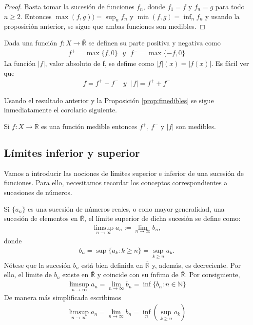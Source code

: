 \begin{proof}
    Basta tomar la sucesión de funciones $f_n$, donde $f_1 = f$ y $f_n = g$ para todo $n \ge 2$. Entonces $\max(f,g) ) = \sup_n{f_n}$ y $\min(f,g) = \inf_n{f_n}$ y usando la proposición anterior, se sigue que ambas funciones son medibles.
\end{proof}

\begin{defi}
    Dada una función $f: X \longrightarrow \overline{\mathbb{R}}$ se definen su parte positiva y negativa como
    \begin{align*}
        f^+ = \max\{ f, 0\} \ \ \ y \ \ \ f^- = \max\{ -f, 0\}
    \end{align*}
    La función $|f|$, valor absoluto de f, se defime como $|f|(x) = |f(x)|$. Es fácil ver que
    \begin{align*}
        f = f^+ - f^- \ \ \ y \ \ \ |f| = f^+ + f^-
    \end{align*}
\end{defi}
Usando el resultado anterior y la Proposición \ref{prop:fmedibles} se sigue inmediatamente el corolario siguiente.

\begin{cor}
    Si $f: X \longrightarrow \overline{\mathbb{R}}$ es una función medible entonces $f^+$, $f^-$ y $|f|$ son medibles.
\end{cor}

\subsection{Límites inferior y superior}

Vamos a introducir las nociones de límites superior e inferior de una sucesión de funciones. Para ello, necesitamos recordar los conceptos correspondientes a sucesiones de números.

\begin{defi}
    Si $\{a_n\}$ es una sucesión de números reales, o cono mayor generalidad, una sucesión de elementos en $\overline{\mathbb{R}}$, el límite superior de dicha sucesión se define como:
    \begin{align*}
        \limsup_{n \to \infty}{a_n} := \lim_{n \to \infty}{b_n},
    \end{align*}
    donde
    \begin{align*}
        b_n = \sup{\{ a_k : k \ge n\}} = \sup_{k \ge n}{a_k}.
    \end{align*}
    Nótese que la sucesión $b_n$ está bien definida en $\overline{\mathbb{R}}$ y, además, es decreciente. Por ello, el límite de $b_n$ existe en $\overline{\mathbb{R}}$ y coincide con su ínfimo de $\overline{\mathbb{R}}$. Por consiguiente,
    \begin{align*}
        \limsup_{n \to \infty}{a_n} = \lim_{n \to \infty}{b_n} = \inf{\{ b_n : n \in \mathbb{N}\}}
    \end{align*}
    De manera más simplificada escribimos
    \begin{align*}
        \limsup_{n \to \infty}{a_n} = \lim_{n \to \infty}{b_n} = \inf_n{(\sup_{k \ge n}{a_k})}
    \end{align*}
\end{defi}


